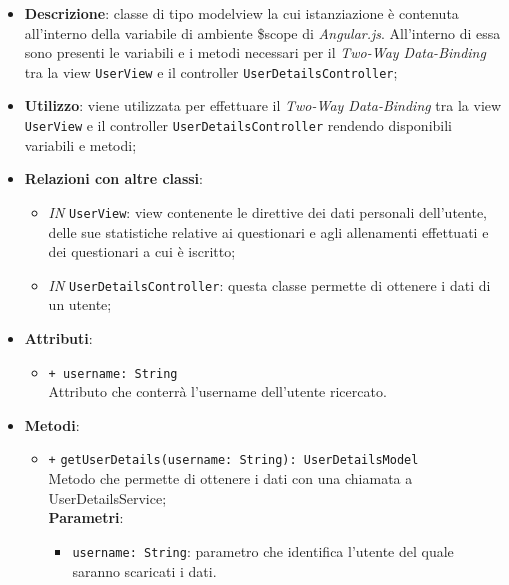 		\begin{itemize}
			\item \textbf{Descrizione}: classe di tipo modelview la cui istanziazione è contenuta all'interno della variabile di ambiente \$scope di \textit{Angular.js}. All'interno di essa sono presenti le variabili e i metodi necessari per il \textit{Two-Way Data-Binding} tra la view \texttt{UserView} e il controller \texttt{UserDetailsController};
			\item \textbf{Utilizzo}: viene utilizzata per effettuare il \textit{Two-Way Data-Binding} tra la view \texttt{UserView} e il controller \texttt{UserDetailsController} rendendo disponibili variabili e metodi;
			\item \textbf{Relazioni con altre classi}: 
			\begin{itemize}
				\item \textit{IN} \texttt{UserView}: view contenente le direttive dei dati personali dell'utente, delle sue statistiche relative ai questionari e agli allenamenti effettuati e dei questionari a cui è iscritto; 
				\item \textit{IN} \texttt{UserDetailsController}: questa classe permette di ottenere i dati di un utente;
			\end{itemize}
			\item \textbf{Attributi}: 
			\begin{itemize}
				\item \texttt{+ username: String} \\ Attributo che conterrà l'username dell'utente ricercato.
			\end{itemize}
			\item \textbf{Metodi}:
			\begin{itemize}
				\item \texttt{+} \texttt{getUserDetails(username: String): UserDetailsModel} \\ Metodo che permette di ottenere i dati con una chiamata a UserDetailsService; \\
				\textbf{Parametri}:
				\begin{itemize}
					\item \texttt{username: String}: parametro che identifica l'utente del quale saranno scaricati i dati.
				\end{itemize} 
			\end{itemize}
		\end{itemize}
		
			